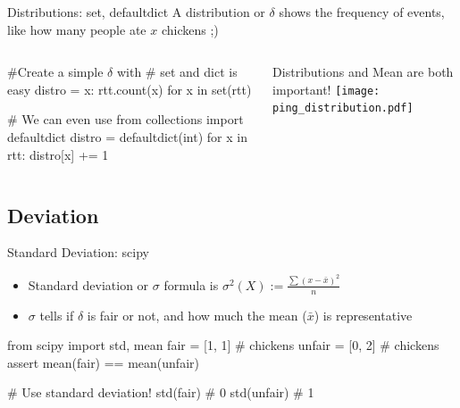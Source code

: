 \begin{frame}[fragile]{Distributions: set, defaultdict}
A distribution or $\delta$ shows the frequency of events, like 
how many people ate $x$ chickens ;)
\begin{columns}
\begin{pythoncode}
#Create a simple $\delta$ with
#    set and dict is easy
distro = {x: rtt.count(x) 
  for x in set(rtt)}
  
# We can even use
from collections import defaultdict
distro = defaultdict(int)
for x in rtt:
    distro[x] += 1
    

\end{pythoncode}
\footnotesize
Distributions and Mean are both important!
\texttt{[image: ping\_distribution.pdf]}  
\end{columns}
\end{frame}

\subsection{Deviation}
\begin{frame}[fragile]{Standard Deviation: scipy}
\begin{itemize}
\item Standard deviation or $\sigma$ formula is  $\sigma^{2}(X) := \frac{ \sum(x-\bar{x})^{2} }{n} $
\item $\sigma$ tells if $\delta$ is fair or not, and how much the mean ($\bar{x}$) is representative
\end{itemize}
\begin{pythoncode}
from scipy import std, mean
fair = [1, 1] # chickens
unfair = [0, 2] # chickens
assert mean(fair) == mean(unfair)

# Use standard deviation!
std(fair) # 0
std(unfair) # 1
\end{pythoncode}
\end{frame}


